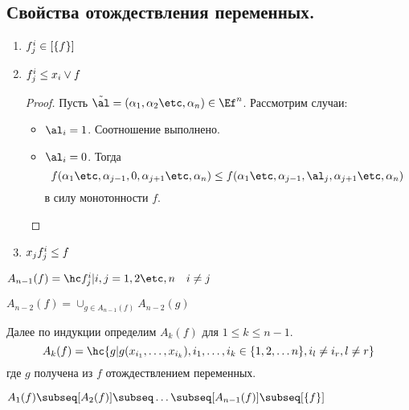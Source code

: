 \documentclass[unicode, 10pt, a4paper, oneside, fleqn]{article}
\begin{document}
\subsection{Свойства отождествления переменных.}
\begin{enumerate}
  \item $f^i_j \in [\{f\}]$
  \item 
    \begin{lemma}
      $f^i_j \le x_i\vee f$
    \end{lemma}
    \begin{proof}
      Пусть $\alt=(\set{n}) \in \Ef^n$. Рассмотрим случаи:
      \begin{itemize}
        \item $\al_i=1$. Соотношение выполнено.
        \item $\al_i=0$. Тогда \CHECK
          \begin{displaymath}
            f(\seti{1}{j-1},0,\seti{j+1}{n}) \le f(\seti{1}{j-1},\al_j,\seti{j+1}{n})
          \end{displaymath}
          в силу монотонности $f$.
      \end{itemize}
    \end{proof}
      \item 
        \begin{lemma}
          \begin{math}
            x_jf^i_j \le f
          \end{math}
        \end{lemma}
\end{enumerate}
\begin{df}
  \begin{math}
    A_{n-1}(f) = \setof{\fij}{i,j=1,2\etc,n \quad i\ne j}
  \end{math}
\end{df}
\begin{df}
  \begin{math}
    A_{n-2}(f) = \cup_{g \in A_{n-1}(f)}A_{n-2}(g)
  \end{math}
\end{df}
\begin{df}
  Далее по индукции определим $A_k(f)$ для $1\le k\le n-1$.
  \begin{displaymath}
    A_k(f)=\hc{g | g(x_{i_1},\ldots,x_{i_k}), i_1,\ldots,i_k\in \{1,2,\ldots n\}, i_l\ne i_r, l\ne r }
  \end{displaymath}
где $g$ получена из $f$ отождествлением переменных.\\
\end{df}
\begin{stm}
  \begin{math}
    A_1(f) \subseq [A_2(f)] \subseq\ldots\subseq [A_{n-1}(f)]\subseq\cls{f}
  \end{math}
\end{stm}
\end{document}
